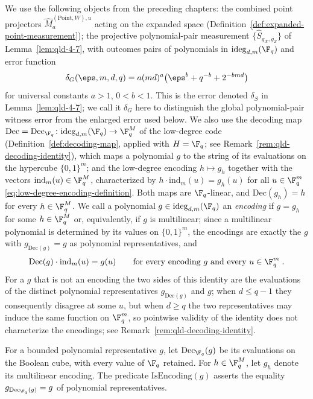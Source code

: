 We use the following objects from the preceding chapters: the combined point projectors $\hat{M}^{(\mathrm{Point},W),u}_a$ acting on the expanded space (Definition~\ref{def:expanded-point-measurement}); the projective polynomial-pair measurement $\{\hat{S}_{g_X,g_Z}\}$ of Lemma~\ref{lem:qld-4-7}, with outcomes pairs of polynomials in $\mathrm{ideg}_{d,m}(\F_q)$ and error function
\[
	\delta_G(\eps,m,d,q) = a(md)^a\bigl(\eps^b + q^{-b} + 2^{-bmd}\bigr)
\]
for universal constants $a > 1$, $0 < b < 1$. This is the error denoted $\delta_S$ in Lemma~\ref{lem:qld-4-7}; we call it $\delta_G$ here to distinguish the global polynomial-pair witness error from the enlarged error used below. We also use the decoding map $\mathrm{Dec} = \mathrm{Dec}_{\F_q}\colon \mathrm{ideg}_{d,m}(\F_q) \to \F_q^{M}$ of the low-degree code (Definition~\ref{def:decoding-map}, applied with $H = \F_q$; see Remark~\ref{rem:qld-decoding-identity}), which maps a polynomial $g$ to the string of its evaluations on the hypercube $\{0,1\}^m$; and the low-degree encoding $h \mapsto g_h$ together with the vectors $\mathrm{ind}_m(u) \in \F_q^M$, characterized by $h \cdot \mathrm{ind}_m(u) = g_h(u)$ for all $u \in \F_q^m$ \eqref{eq:low-degree-encoding-definition}. Both maps are $\F_q$-linear, and $\mathrm{Dec}(g_h) = h$ for every $h \in \F_q^{M}$. We call a polynomial $g \in \mathrm{ideg}_{d,m}(\F_q)$ an \emph{encoding} if $g = g_h$ for some $h \in \F_q^{M}$ or, equivalently, if $g$ is multilinear; since a multilinear polynomial is determined by its values on $\{0,1\}^m$, the encodings are exactly the $g$ with $g_{\mathrm{Dec}(g)} = g$ as polynomial representatives, and
\[
	\mathrm{Dec}(g) \cdot \mathrm{ind}_m(u) = g(u)
	\qquad \text{for every encoding $g$ and every } u \in \F_q^m\;.
\]
For a $g$ that is not an encoding the two sides of this identity are the evaluations of the distinct polynomial representatives $g_{\mathrm{Dec}(g)}$ and $g$; when $d \leq q-1$ they consequently disagree at some $u$, but when $d \geq q$ the two representatives may induce the same function on $\F_q^m$, so pointwise validity of the identity does not characterize the encodings; see Remark~\ref{rem:qld-decoding-identity}.

\begin{definition}\label{def:qld-full-field-decoder}
	\leanok
	For a bounded polynomial representative $g$, let $\mathrm{Dec}_{\F_q}(g)$ be its evaluations on the Boolean cube, with every value of $\F_q$ retained. For $h \in \F_q^M$, let $g_h$ denote its multilinear encoding. The predicate $\mathrm{IsEncoding}(g)$ asserts the equality $g_{\mathrm{Dec}_{\F_q}(g)}=g$ of polynomial representatives.
\end{definition}


